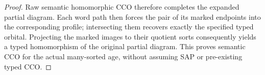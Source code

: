 \begin{proof}
Raw semantic homomorphic CCO therefore completes the expanded
partial diagram.  Each word path then forces the pair of its
marked endpoints into the corresponding profile; intersecting
them recovers exactly the specified typed orbital.  Projecting
the marked images to their quotient sorts consequently yields a
typed homomorphism of the original partial diagram.  This proves
semantic CCO for the actual many-sorted age, without assuming
SAP or pre-existing typed CCO.
\end{proof}
